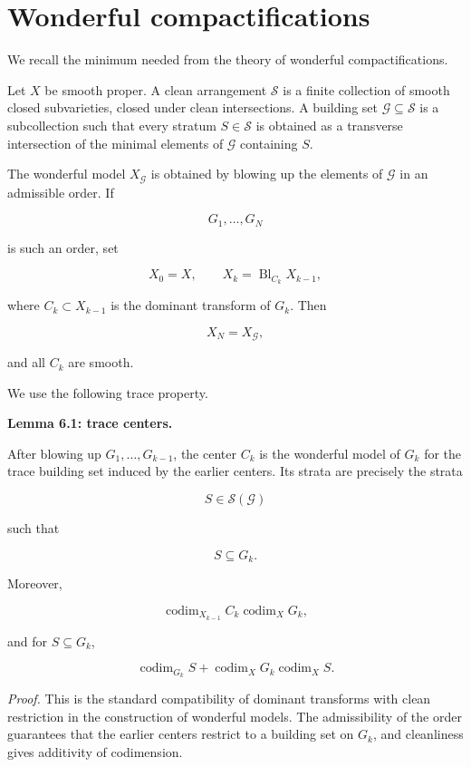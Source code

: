 \documentclass[11pt]{amsart}
\theoremstyle{definition}
\begin{document}
\section{Wonderful compactifications}

We recall the minimum needed from the theory of wonderful compactifications.

Let $X$ be smooth proper. A clean arrangement $\mathcal S$ is a finite collection of smooth closed subvarieties, closed under clean intersections. A building set $\mathcal G\subseteq\mathcal S$ is a subcollection such that every stratum $S\in\mathcal S$ is obtained as a transverse intersection of the minimal elements of $\mathcal G$ containing $S$.

The wonderful model $X_{\mathcal G}$ is obtained by blowing up the elements of $\mathcal G$ in an admissible order. If

\[
G_1,\dots,G_N
\]

is such an order, set

\[
X_0=X,
\qquad
X_k=\operatorname{Bl}_{C_k}X_{k-1},
\]

where $C_k\subset X_{k-1}$ is the dominant transform of $G_k$. Then

\[
X_N=X_{\mathcal G},
\]

and all $C_k$ are smooth.

We use the following trace property.

\noindent\textbf{Lemma 6.1: trace centers.}

After blowing up $G_1,\dots,G_{k-1}$, the center $C_k$ is the wonderful model of $G_k$ for the trace building set induced by the earlier centers. Its strata are precisely the strata

\[
S\in\mathcal S(\mathcal G)
\]

such that

\[
S\subseteq G_k.
\]

Moreover,

\[
\operatorname{codim}_{X_{k-1}}C_k
\operatorname{codim}_XG_k,
\]

and for $S\subseteq G_k$,

\[
\operatorname{codim}_{G_k}S+\operatorname{codim}_XG_k
\operatorname{codim}_XS.
\]

\noindent\emph{Proof.} This is the standard compatibility of dominant transforms with clean restriction in the construction of wonderful models. The admissibility of the order guarantees that the earlier centers restrict to a building set on $G_k$, and cleanliness gives additivity of codimension.
\end{document}
